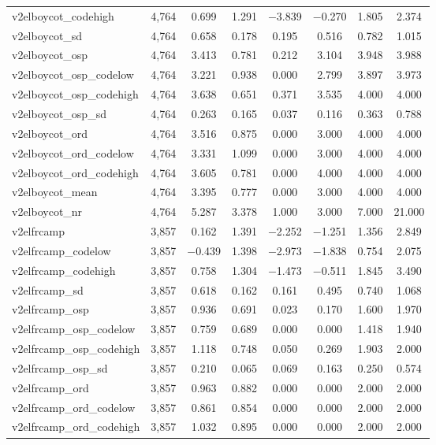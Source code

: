 \begin{table}[!htbp]
\begin{tabular}{@{\extracolsep{5pt}}lccccccc}
v2elboycot\_codehigh & 4,764 & 0.699 & 1.291 & $-$3.839 & $-$0.270 & 1.805 & 2.374 \\ 
v2elboycot\_sd & 4,764 & 0.658 & 0.178 & 0.195 & 0.516 & 0.782 & 1.015 \\ 
v2elboycot\_osp & 4,764 & 3.413 & 0.781 & 0.212 & 3.104 & 3.948 & 3.988 \\ 
v2elboycot\_osp\_codelow & 4,764 & 3.221 & 0.938 & 0.000 & 2.799 & 3.897 & 3.973 \\ 
v2elboycot\_osp\_codehigh & 4,764 & 3.638 & 0.651 & 0.371 & 3.535 & 4.000 & 4.000 \\ 
v2elboycot\_osp\_sd & 4,764 & 0.263 & 0.165 & 0.037 & 0.116 & 0.363 & 0.788 \\ 
v2elboycot\_ord & 4,764 & 3.516 & 0.875 & 0.000 & 3.000 & 4.000 & 4.000 \\ 
v2elboycot\_ord\_codelow & 4,764 & 3.331 & 1.099 & 0.000 & 3.000 & 4.000 & 4.000 \\ 
v2elboycot\_ord\_codehigh & 4,764 & 3.605 & 0.781 & 0.000 & 4.000 & 4.000 & 4.000 \\ 
v2elboycot\_mean & 4,764 & 3.395 & 0.777 & 0.000 & 3.000 & 4.000 & 4.000 \\ 
v2elboycot\_nr & 4,764 & 5.287 & 3.378 & 1.000 & 3.000 & 7.000 & 21.000 \\ 
v2elfrcamp & 3,857 & 0.162 & 1.391 & $-$2.252 & $-$1.251 & 1.356 & 2.849 \\ 
v2elfrcamp\_codelow & 3,857 & $-$0.439 & 1.398 & $-$2.973 & $-$1.838 & 0.754 & 2.075 \\ 
v2elfrcamp\_codehigh & 3,857 & 0.758 & 1.304 & $-$1.473 & $-$0.511 & 1.845 & 3.490 \\ 
v2elfrcamp\_sd & 3,857 & 0.618 & 0.162 & 0.161 & 0.495 & 0.740 & 1.068 \\ 
v2elfrcamp\_osp & 3,857 & 0.936 & 0.691 & 0.023 & 0.170 & 1.600 & 1.970 \\ 
v2elfrcamp\_osp\_codelow & 3,857 & 0.759 & 0.689 & 0.000 & 0.000 & 1.418 & 1.940 \\ 
v2elfrcamp\_osp\_codehigh & 3,857 & 1.118 & 0.748 & 0.050 & 0.269 & 1.903 & 2.000 \\ 
v2elfrcamp\_osp\_sd & 3,857 & 0.210 & 0.065 & 0.069 & 0.163 & 0.250 & 0.574 \\ 
v2elfrcamp\_ord & 3,857 & 0.963 & 0.882 & 0.000 & 0.000 & 2.000 & 2.000 \\ 
v2elfrcamp\_ord\_codelow & 3,857 & 0.861 & 0.854 & 0.000 & 0.000 & 2.000 & 2.000 \\ 
v2elfrcamp\_ord\_codehigh & 3,857 & 1.032 & 0.895 & 0.000 & 0.000 & 2.000 & 2.000 \\ 

\end{tabular}
\end{table}
